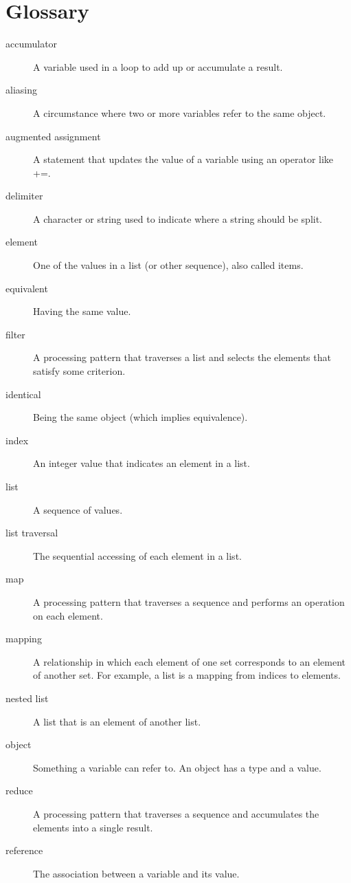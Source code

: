 \documentclass{article}
\begin{document}
\section*{Glossary}
\begin{description}
\item [accumulator] A variable used in a loop to add up or accumulate a result. 
\item [aliasing] A circumstance where two or more variables refer to the same object. 
\item [augmented assignment] A statement that updates the value of a variable using an operator like +=. 
\item [delimiter] A character or string used to indicate where a string should be split. 
\item [element] One of the values in a list (or other sequence), also called items. 
\item [equivalent] Having the same value. 
\item [filter] A processing pattern that traverses a list and selects the elements that satisfy some criterion. 
\item [identical] Being the same object (which implies equivalence). 
\item [index] An integer value that indicates an element in a list. 
\item [list] A sequence of values. 
\item [list traversal] The sequential accessing of each element in a list. 
\item [map] A processing pattern that traverses a sequence and performs an operation on each element. 
\item [mapping] A relationship in which each element of one set corresponds to an element of another set. For example, a list is a mapping from indices to elements. 
\item [nested list] A list that is an element of another list. 
\item [object] Something a variable can refer to. An object has a type and a value. 
\item [reduce] A processing pattern that traverses a sequence and accumulates the elements into a single result. 
\item [reference] The association between a variable and its value. 
\end{description}
\end{document}
